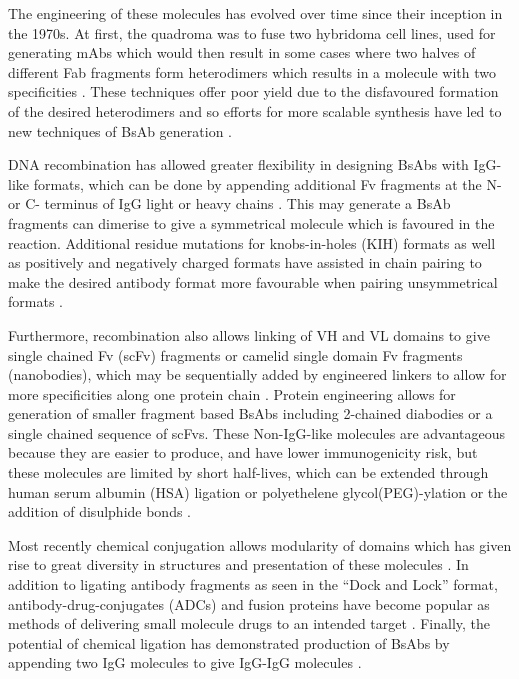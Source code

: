 \documentclass{article}
\begin{document}
The engineering of these molecules has evolved over time since their
inception in the 1970s. At first, the quadroma was to fuse two
hybridoma cell lines, used for generating mAbs which would then result
in some cases where two halves of different Fab fragments form
heterodimers which results in a molecule with two specificities
\cite{milstein:1983,kontermann:2015}. These
techniques offer poor yield due to the disfavoured formation of the
desired heterodimers and so efforts for more scalable synthesis have
led to new techniques of BsAb generation \cite{spiess:2015}. 

DNA recombination has allowed greater flexibility in designing  BsAbs
with IgG-like formats, which can be done by appending additional Fv
fragments at the N- or C- terminus of IgG light or heavy chains
\cite{brinkmann:2017}. This may generate a BsAb fragments 
can dimerise to give a symmetrical molecule which is favoured in the
reaction. Additional residue mutations for knobs-in-holes (KIH)
formats \cite{ridgway:1996} as well as positively and negatively
charged formats \cite{gunasekaran:2010} have assisted in chain
pairing to make the desired antibody format more favourable when
pairing unsymmetrical formats \cite{spiess:2015}.   

Furthermore, recombination also allows linking of VH and VL domains to
give single chained Fv (scFv) fragments or camelid single domain Fv
fragments (nanobodies), which may be sequentially added by engineered
linkers to allow for more specificities along one protein chain
\cite{legall:1999}. Protein engineering allows for generation of 
smaller fragment based BsAbs including 2-chained diabodies or a single
chained sequence of scFvs. These Non-IgG-like molecules are
advantageous because they are easier to produce,  and have lower
immunogenicity risk, but these molecules are limited by short
half-lives, which can be extended through human serum albumin (HSA)
ligation or polyethelene glycol(PEG)-ylation or the addition of
disulphide bonds \cite{kontermann:2011,ma:2021}. 

Most recently chemical conjugation allows modularity of domains which
has given rise to great diversity in structures and presentation of
these molecules \cite{spiess:2015}. In addition to ligating antibody
fragments as seen in the ``Dock and Lock'' format,
antibody-drug-conjugates (ADCs) and fusion proteins have become
popular as methods of delivering small molecule drugs to an intended
target \cite{sau:2017}. Finally, the potential of chemical ligation
has demonstrated production of BsAbs by appending two IgG molecules to
give IgG-IgG molecules \cite{szijj:2021}.  
\end{document}

